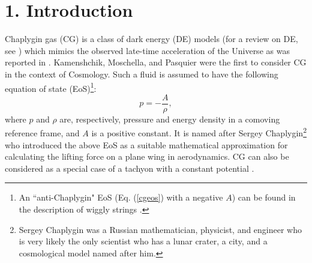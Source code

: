 \documentclass[two-column, nofootinbib]{revtex4-1}
\begin{document}
\maketitle



\section*{1. Introduction}

Chaplygin gas (CG) is a class of dark energy (DE) models (for a review on DE, see \cite{Copeland1,Amendola0}) which mimics the observed late-time acceleration of the Universe as was reported in \cite{Riess1,Perlmutter1,Bachall1}. Kamenshchik, Moschella, and Pasquier \cite{Kamenshchik1} were the first to consider CG in the context of Cosmology. Such a fluid is assumed to have the following equation of state (EoS)\footnote{An ``anti-Chaplygin" EoS (Eq. (\ref{cgeos}) with a negative $A$) can be found in the description of wiggly strings \cite{Carter1,Vilenkin1}.}:
\begin{equation} \label{cgeos}
p=-\frac{A}{\rho},
\end{equation}
where $p$ and $\rho$ are, respectively, pressure and energy density in a comoving reference frame, and $A$ is a positive constant. It is named after Sergey Chaplygin\footnote{Sergey Chaplygin was a Russian mathematician, physicist, and engineer who is very likely the only scientist who has a lunar crater, a city, and a cosmological model named after him.} who introduced the above EoS \cite{Chaplygin1} as a suitable mathematical approximation for calculating the lifting force on a plane wing in aerodynamics. CG can also be considered as a special case of a tachyon with a constant potential \cite{Frolov1,Copeland1}.
\end{document}

